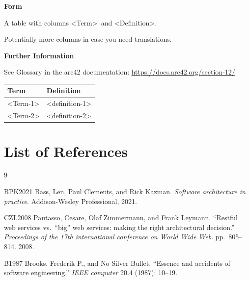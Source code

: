 \documentclass[12pt,a4paper]{article}
\newcommand{\minititle}[1]{%
  \par\addvspace{0.6\baselineskip}%
  \noindent\textbf{#1}\par\nobreak%
  \noindent\ignorespaces%
}
\begin{document}
\minititle{Form}
A table with columns \textless Term\textgreater\ and \textless Definition\textgreater.

Potentially more columns in case you need translations.

\minititle{Further Information}
See Glossary in the arc42 documentation:
\href{https://docs.arc42.org/section-12/}{https://docs.arc42.org/section-12/}

\begin{longtable}{p{4cm} p{10cm}}
\toprule
Term & Definition \\
\midrule
\textless Term-1\textgreater & \textless definition-1\textgreater \\
\textless Term-2\textgreater & \textless definition-2\textgreater \\
\bottomrule
\end{longtable}

\newpage
\section*{List of References}

%

\begin{thebibliography}{9}

BPK2021 Bass, Len, Paul Clements, and Rick Kazman. \textit{Software architecture in practice}. Addison-Wesley Professional, 2021.

CZL2008 Pautasso, Cesare, Olaf Zimmermann, and Frank Leymann. ``Restful web services vs.\ ``big'' web services: making the right architectural decision.'' \textit{Proceedings of the 17th international conference on World Wide Web}. pp.\ 805--814. 2008.

B1987 Brooks, Frederik P., and No Silver Bullet. ``Essence and accidents of software engineering.'' \textit{IEEE computer} 20.4 (1987): 10--19.

\end{thebibliography}
\end{document}
